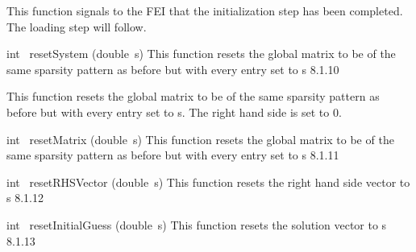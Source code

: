 \documentclass{article}
\begin{document}
\begin{cxxentry}
\begin{cxxentry}
\begin{cxxfunction}
\begin{cxxdoc}
This function signals to the FEI that the initialization step has
been completed. The loading step will follow.

\end{cxxdoc}
\end{cxxfunction}
\begin{cxxfunction}
{int\ }
        {resetSystem}
        {(double\ s)}
        {
This function resets the global matrix to be of the same sparsity
pattern as before but with every entry set to s}
        {8.1.10}
\begin{cxxdoc}

This function resets the global matrix to be of the same sparsity
pattern as before but with every entry set to s. The right hand
side is set to 0.

\end{cxxdoc}
\end{cxxfunction}
\begin{cxxfunction}
{int\ }
        {resetMatrix}
        {(double\ s)}
        {
This function resets the global matrix to be of the same sparsity
pattern as before but with every entry set to s}
        {8.1.11}
\begin{cxxdoc}

\end{cxxdoc}
\end{cxxfunction}
\begin{cxxfunction}
{int\ }
        {resetRHSVector}
        {(double\ s)}
        {
This function resets the right hand side vector to s}
        {8.1.12}
\begin{cxxdoc}

\end{cxxdoc}
\end{cxxfunction}
\begin{cxxfunction}
{int\ }
        {resetInitialGuess}
        {(double\ s)}
        {
This function resets the solution vector to s}
        {8.1.13}
\begin{cxxdoc}


\end{cxxdoc}
\end{cxxfunction}
\end{cxxentry}
\end{cxxentry}
\end{document}

